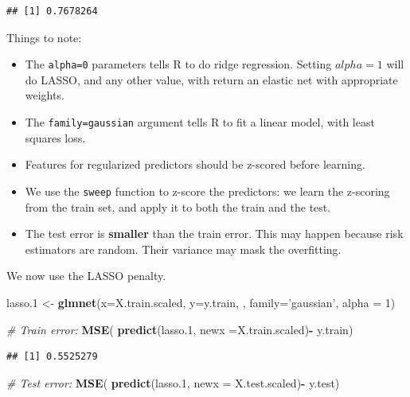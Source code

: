 \documentclass[]{book}
\newenvironment{Shaded}{\begin{snugshade}}{\end{snugshade}}
\newcommand{\KeywordTok}[1]{\textcolor[rgb]{0.13,0.29,0.53}{\textbf{#1}}}
\newcommand{\DataTypeTok}[1]{\textcolor[rgb]{0.13,0.29,0.53}{#1}}
\newcommand{\DecValTok}[1]{\textcolor[rgb]{0.00,0.00,0.81}{#1}}
\newcommand{\StringTok}[1]{\textcolor[rgb]{0.31,0.60,0.02}{#1}}
\newcommand{\CommentTok}[1]{\textcolor[rgb]{0.56,0.35,0.01}{\textit{#1}}}
\newcommand{\OperatorTok}[1]{\textcolor[rgb]{0.81,0.36,0.00}{\textbf{#1}}}
\newcommand{\NormalTok}[1]{#1}
\providecommand{\tightlist}{%
  \setlength{\itemsep}{0pt}\setlength{\parskip}{0pt}}
\theoremstyle{definition}
\theoremstyle{definition}
\theoremstyle{definition}
\theoremstyle{remark}
\begin{document}
\begin{verbatim}
## [1] 0.7678264
\end{verbatim}

Things to note:

\begin{itemize}
\tightlist
\item
  The \texttt{alpha=0} parameters tells R to do ridge regression.
  Setting \(alpha=1\) will do LASSO, and any other value, with return an
  elastic net with appropriate weights.
\item
  The \texttt{family=\textquotesingle{}gaussian\textquotesingle{}}
  argument tells R to fit a linear model, with least squares loss.
\item
  Features for regularized predictors should be z-scored before
  learning.
\item
  We use the \texttt{sweep} function to z-score the predictors: we learn
  the z-scoring from the train set, and apply it to both the train and
  the test.
\item
  The test error is \textbf{smaller} than the train error. This may
  happen because risk estimators are random. Their variance may mask the
  overfitting.
\end{itemize}

We now use the LASSO penalty.

\begin{Shaded}
\begin{Highlighting}[]
\NormalTok{lasso.}\DecValTok{1}\NormalTok{ <-}\StringTok{ }\KeywordTok{glmnet}\NormalTok{(}\DataTypeTok{x=}\NormalTok{X.train.scaled, }\DataTypeTok{y=}\NormalTok{y.train, , }\DataTypeTok{family=}\StringTok{'gaussian'}\NormalTok{, }\DataTypeTok{alpha =} \DecValTok{1}\NormalTok{)}

\CommentTok{# Train error:}
\KeywordTok{MSE}\NormalTok{( }\KeywordTok{predict}\NormalTok{(lasso.}\DecValTok{1}\NormalTok{, }\DataTypeTok{newx =}\NormalTok{X.train.scaled)}\OperatorTok{-}\StringTok{ }\NormalTok{y.train)}
\end{Highlighting}
\end{Shaded}

\begin{verbatim}
## [1] 0.5525279
\end{verbatim}

\begin{Shaded}
\begin{Highlighting}[]
\CommentTok{# Test error:}
\KeywordTok{MSE}\NormalTok{( }\KeywordTok{predict}\NormalTok{(lasso.}\DecValTok{1}\NormalTok{, }\DataTypeTok{newx =}\NormalTok{ X.test.scaled)}\OperatorTok{-}\StringTok{ }\NormalTok{y.test)}
\end{Highlighting}
\end{Shaded}
\end{document}

